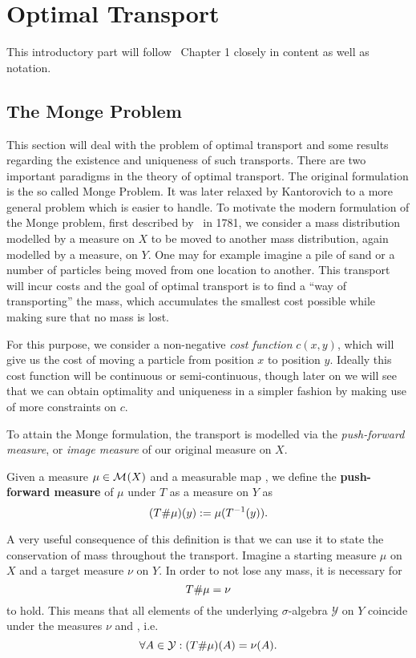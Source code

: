 \chapter{Optimal Transport}\label{OT}

This introductory part will follow~\cite{San2015} Chapter 1 closely in content as well as notation.

\section{The Monge Problem}\label{TheMonProb}
This section will deal with the problem of optimal transport and some results regarding the existence and uniqueness of such transports. There are two important paradigms in the theory of optimal transport. The original formulation is the so called Monge Problem. It was later relaxed by Kantorovich to a more general problem which is easier to handle. To motivate the modern formulation of the Monge problem, first described by\ \cite{Mon1781} in 1781, we consider a mass distribution modelled by a measure on $X$ to be moved to another mass distribution, again modelled by a measure, on $Y$. One may for example imagine a pile of sand or a number of particles being moved from one location to another. This transport will incur costs and the goal of optimal transport is to find a ``way of transporting'' the mass, which accumulates the smallest cost possible while making sure that no mass is lost.

For this purpose, we consider a non-negative \textit{cost function} $c(x, y)$, which will give us the cost of moving a particle from position $x$ to position $y$. Ideally this cost function will be continuous or semi-continuous, though later on we will see that we can obtain optimality and uniqueness in a simpler fashion by making use of more constraints on $c$.

To attain the Monge formulation, the transport is modelled via the \textit{push-forward measure}, or \textit{image measure} of our original measure on $X$.

\begin{definition}\label{PushForward}
	Given a measure $\mu \in \mathcal{M}_{}(X)$ and a measurable map , we define the \textbf{push-forward measure} of $\mu$ under $T$ as a measure on $Y$ as
	\[ ({T} \# \mu)(y) := \mu(T^{-1} (y)). \]
\end{definition}

A very useful consequence of this definition is that we can use it to state the conservation of mass throughout the transport. Imagine a starting measure $\mu$ on $X$ and a target measure $\nu$ on $Y$. In order to not lose any mass, it is necessary for
\[ {T} \# \mu = \nu \]
to hold. This means that all elements of the underlying $\sigma$-algebra $\mathcal{Y}$ on $Y$ coincide under the measures $\nu$ and \push{\mu}, i.e.
\[ \forall A \in \mathcal{Y}: ({T} \# \mu)(A) = \nu(A).\]

